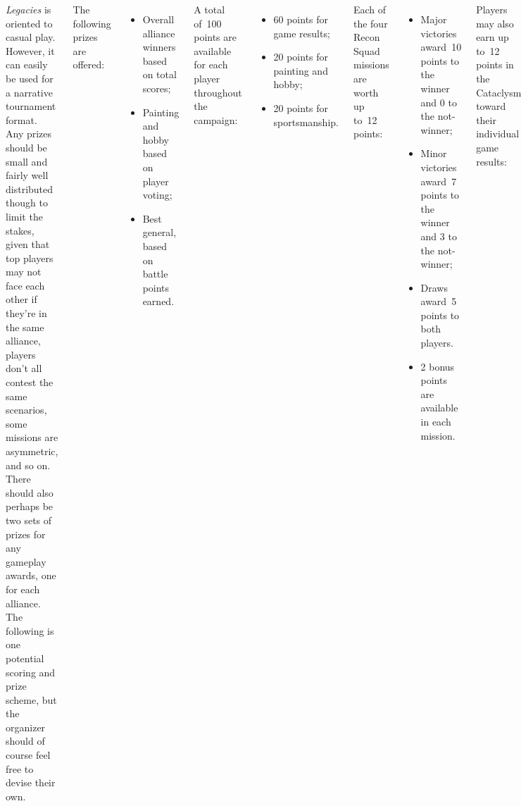 \begin{columns}

\emph{Legacies} is oriented to casual play.  However, it can easily be
used for a narrative tournament format.  Any prizes should be small
and fairly well distributed though to limit the stakes, given that top
players may not face each other if they're in the same alliance,
players don't all contest the same scenarios, some missions are
asymmetric, and so on.  There should also perhaps be two sets of
prizes for any gameplay awards, one for each alliance.  The following
is one potential scoring and prize scheme, but the organizer should of
course feel free to devise their own.

 The following prizes are offered:

\begin{itemize}\shortlist
\item Overall alliance winners based on total scores;
\item Painting and hobby based on player voting;
\item Best general, based on battle points earned.
\end{itemize}

 A total of~100 points are
available for each player throughout the campaign:

\begin{itemize}\shortlist
\item 60 points for game results;
\item 20 points for painting and hobby;
\item 20 points for sportsmanship.
\end{itemize}


Each of the four Recon Squad missions are worth up to~12 points:
\begin{itemize}\shortlist
\item Major victories award~10 points to the winner and 0 to the not-winner;
\item Minor victories award~7 points to the winner and 3 to the not-winner;
\item Draws award~5 points to both players.
\item 2 bonus points are available in each mission.
\end{itemize}

Players may also earn up to~12 points in the Cataclysm toward their
individual game results:
\begin{itemize}\shortlist
\item 7 points for winning their Cataclysm Objective;
\item 3 points if they earned their Legacy Bonus;
\item 2 points if their alliance won the Cataclysm.
\end{itemize}



\end{columns}
